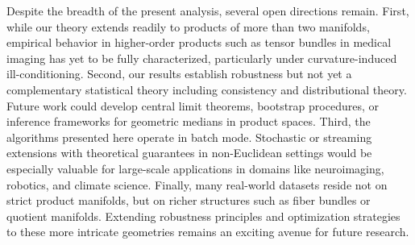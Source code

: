 \documentclass[10pt]{article}
\begin{document}
Despite the breadth of the present analysis, several open directions remain. First, while our theory extends readily to products of more than two manifolds, empirical behavior in higher-order products such as tensor bundles in medical imaging has yet to be fully characterized, particularly under curvature-induced ill-conditioning. Second, our results establish robustness but not yet a complementary statistical theory including consistency and distributional theory. Future work could develop central limit theorems, bootstrap procedures, or inference frameworks for geometric medians in product spaces. Third, the algorithms presented here operate in batch mode. Stochastic or streaming extensions with theoretical guarantees in non-Euclidean settings would be especially valuable for large-scale applications in domains like neuroimaging, robotics, and climate science. Finally, many real-world datasets reside not on strict product manifolds, but on richer structures such as fiber bundles or quotient manifolds. Extending robustness principles and optimization strategies to these more intricate geometries remains an exciting avenue for future research.



\end{document}
